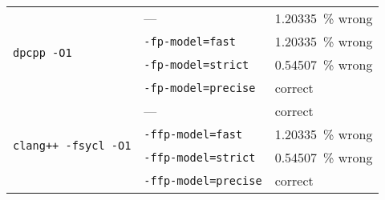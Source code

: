 \documentclass[../main]{subfiles}
\begin{document}
\begin{table}[!htbp]
	\begin{tabular}{@{}lll@{}}
		\toprule
		\multirow{4}{*}{\texttt{dpcpp -O1}}          & ---                          & \qty{1.20335}{\percent} wrong \\
		                                             & \texttt{-fp-model=fast   }   & \qty{1.20335}{\percent} wrong \\
		                                             & \texttt{-fp-model=strict }   & \qty{0.54507}{\percent} wrong \\
		                                             & \texttt{-fp-model=precise}   & correct                       \\
		\midrule
		\multirow{4}{*}{\texttt{clang++ -fsycl -O1}} & ---                          & correct                       \\
		                                             & \texttt{-ffp-model=fast    } & \qty{1.20335}{\percent} wrong \\
		                                             & \texttt{-ffp-model=strict }  & \qty{0.54507}{\percent} wrong \\
		                                             & \texttt{-ffp-model=precise}  & correct                       \\ \bottomrule
	\end{tabular}
	\caption{\label{tab:semantics}}
\end{table}
\end{document}
